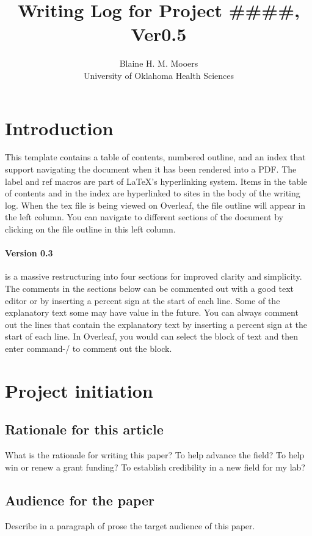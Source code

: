 \documentclass[10pt,letterpaper]{article}
\title{Writing Log for Project \#\#\#\#, Ver0.5}
\author{Blaine H. M. Mooers \\University of Oklahoma Health Sciences}
\begin{document}
\maketitle
\tableofcontents


\section*{Introduction}


This template contains a table of contents, numbered outline, and an index that support navigating the document when it has been rendered into a PDF. 
The label and ref macros are part of LaTeX's hyperlinking system.
Items in the table of contents and in the index are hyperlinked to sites in the body of the writing log.
When the tex file is being viewed on Overleaf, the file outline will appear in the left column.
You can navigate to different sections of the document by clicking on the file outline in this left column.

\paragraph*{Version 0.3} is a massive restructuring into four sections for improved clarity and simplicity.
The comments in the sections below can be commented out with a good text editor or by inserting a percent sign at the start of each line.
Some of the explanatory text some may have value in the future.
You can always comment out the lines that contain the explanatory text by inserting a percent sign at the start of each line.
In Overleaf, you would can select the block of text and then enter command-/ to comment out the block.



\section{Project initiation}
\subsection{Rationale for this article}
\label{sub:why}

What is the rationale for writing this paper?
To help advance the field?
To help win or renew a grant funding?
To establish credibility in a new field for my lab?


\subsection{Audience for the paper}
\label{sub:audience}
Describe in a paragraph of prose the target audience of this paper.
\end{document}
